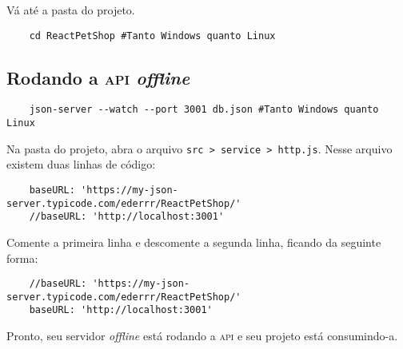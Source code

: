 Vá até a pasta do projeto.

\begin{verbatim}
	cd ReactPetShop #Tanto Windows quanto Linux
\end{verbatim}

\subsection{Rodando a \textsc{api} \emph{offline}}
\begin{verbatim}
	json-server --watch --port 3001 db.json #Tanto Windows quanto Linux
\end{verbatim}

Na pasta do projeto, abra o arquivo \texttt{src > service > http.js}. Nesse
arquivo existem duas linhas de código:

\begin{verbatim}
	baseURL: 'https://my-json-server.typicode.com/ederrr/ReactPetShop/'
	//baseURL: 'http://localhost:3001'
\end{verbatim}

Comente a primeira linha e descomente a segunda linha, ficando da seguinte
forma:

\begin{verbatim}
	//baseURL: 'https://my-json-server.typicode.com/ederrr/ReactPetShop/'
	baseURL: 'http://localhost:3001'
\end{verbatim}

Pronto, seu servidor \emph{offline} está rodando a \textsc{api} e seu projeto
está consumindo-a.



























